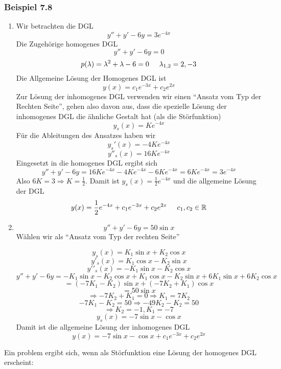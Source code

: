 \subsubsection*{Beispiel 7.8}
\begin{enumerate}
\item Wir betrachten die DGL $$y''+y'-6y=3e^{-4x}$$Die Zugehörige homogenes DGL $$y''+y'-6y=0$$$$p(\lambda)=\lambda^2+\lambda-6=0\text{\hspace{5mm}}\lambda_{1,2}=2,-3$$ Die Allgemeine Lösung der Homogenes DGL ist $$y(x)=c_1e^{-3x}+c_2e^{2x}$$ Zur Lösung der inhomogenes DGL verwenden wir einen ``Ansatz vom Typ der Rechten Seite'', gehen also davon aus, dass die spezielle Lösung der inhomogenes DGL die ähnliche Gestalt hat (als die Störfunktion) $$y_s(x)=Ke^{-4x}$$Für die Ableitungen des Ansatzes haben wir $$y_s'(x)=-4Ke^{-4x}$$$$y''_s(x)=16Ke^{-4x}$$Eingesetzt in die homogenes DGL ergibt sich $$y''+y'-6y=16Ke^{-4x}-4Ke^{-4x}-6Ke^{-4x}=6Ke^{-4x}=3e^{-4x}$$Also $6K=3\Rightarrow K=\frac{1}{2}$. Damit ist $y_s(x)=\frac{1}{2}e^{-4x}$ und die allgemeine Lösung der DGL $$y(x)=\frac{1}{2}e^{-4x}+c_1e^{-3x}+c_2e^{2x}\text{\hspace{5mm}}c_1,c_2\in\mathbb{R}$$
\item $$y''+y'-6y=50\sin x$$ Wählen wir als ``Ansatz vom Typ der rechten Seite''

$${y_s}(x) = {K_1}\sin x + {K_2}\cos x$$
$$y{'_s}(x) = {K_1}\cos x - {K_2}\sin x$$
$$y'{'_s}(x) =  - {K_1}\sin x - {K_2}\cos x$$
$$y'' + y' - 6y =  - {K_1}\sin x - {K_2}\cos x + {K_1}\cos x - {K_2}\sin x + 6{K_1}\sin x + 6{K_2}\cos x$$
$$ = ( - 7{K_1} - {K_2})\sin x + ( - 7{K_2} + {K_1})\cos x$$
$$ = 50\sin x$$
$$ \Rightarrow  - 7{K_2} + {K_1} = 0 \Rightarrow {K_1} = 7{K_2}$$
$$ - 7{K_1} - {K_2} = 50 \Rightarrow  - 49{K_2} - {K_2} = 50$$
$$ \Rightarrow {K_2} =  - 1,{K_1} =  - 7$$
$$y_s(x)=-7\sin x-\cos x$$
Damit ist die allgemeine Lösung der inhomogenes DGL $$y(x)=-7\sin x-\cos x+c_1e^{-3x}+c_2e^{2x}$$
\end{enumerate}
Ein problem ergibt sich, wenn als Störfunktion eine Lösung der homogenes DGL erscheint:
